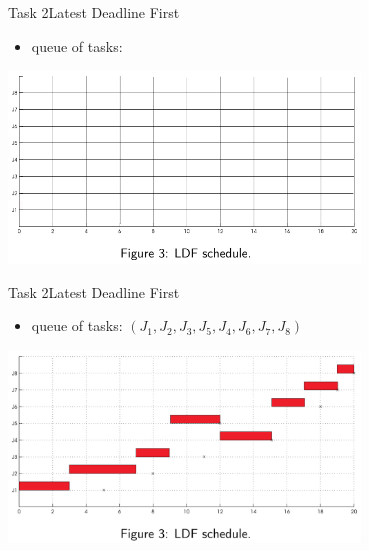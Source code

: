 \begin{frame}{Task 2}{Latest Deadline First}
  \begin{itemize}
    \item \alert{queue of tasks:}
  \end{itemize}
  \centering
  \includegraphics[width=0.7\textwidth]{./figures/2_empty.png}
\end{frame}

\begin{frame}{Task 2}{Latest Deadline First}
  \begin{itemize}
    \item \alert{queue of tasks:}  $(J_1, J_2, J_3, J_5, J_4, J_6, J_7, J_8)$
  \end{itemize}
  \centering
  \includegraphics[width=0.7\textwidth]{./figures/2_sol.png}
\end{frame}
